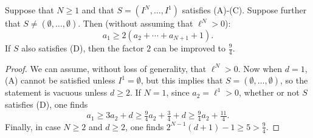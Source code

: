 \documentclass[10pt]{article}
\begin{document}
\begin{KoszulSequenceCombinatorics}
\begin{cor}\label{boundOnA1}Suppose that $N\geq1$ and that $S=(I^N,\ldots,I^1)$ satisfies \textup{(A)}-\textup{(C)}. Suppose further that $S\neq(\emptyset,\ldots,\emptyset)$. Then (without assuming that $\ell^N>0$):
\[a_1\geq2(a_2+\cdots +a_{N+1}+1).\]
If $S$ also satisfies \textup{(D)}, then the factor $2$ can be improved to $\tfrac{9}{4}$.
\end{cor}
\begin{proof}
We can assume, without loss of generality, that $\ell^N>0$. Now when $d=1$, \textup{(A)} cannot be satisfied unless $I^1=\emptyset$, but this implies that $S=(\emptyset,\ldots,\emptyset)$, so the statement is vacuous unless $d\geq2$. If $N=1$, since $a_2=\ell^1>0$, whether or not $S$ satisfies \textup{(D)}, one finds
\[a_1\geq 3a_2+d \geq \tfrac{9}{4}a_2+ \tfrac{3}{4}+d\geq\tfrac{9}{4}a_2+\tfrac{11}{4}.\]
Finally, in case $N\geq2$ and $d\geq2$, one finds $2^{N-1}(d+1)-1\geq5>\tfrac{9}{4}$.
\end{proof}
\end{KoszulSequenceCombinatorics}
\end{document}
